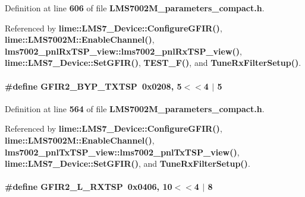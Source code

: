 Definition at line {\bf 606} of file {\bf L\+M\+S7002\+M\+\_\+parameters\+\_\+compact.\+h}.



Referenced by {\bf lime\+::\+L\+M\+S7\+\_\+\+Device\+::\+Configure\+G\+F\+I\+R()}, {\bf lime\+::\+L\+M\+S7002\+M\+::\+Enable\+Channel()}, {\bf lms7002\+\_\+pnl\+Rx\+T\+S\+P\+\_\+view\+::lms7002\+\_\+pnl\+Rx\+T\+S\+P\+\_\+view()}, {\bf lime\+::\+L\+M\+S7\+\_\+\+Device\+::\+Set\+G\+F\+I\+R()}, {\bf T\+E\+S\+T\+\_\+\+F()}, and {\bf Tune\+Rx\+Filter\+Setup()}.

\paragraph[{G\+F\+I\+R2\+\_\+\+B\+Y\+P\+\_\+\+T\+X\+T\+SP}]{\setlength{\rightskip}{0pt plus 5cm}\#define G\+F\+I\+R2\+\_\+\+B\+Y\+P\+\_\+\+T\+X\+T\+SP~0x0208, 5$<$$<$4 $\vert$  5}\label{LMS7002M__parameters__compact_8h_af43e1514b171da01c2199db95be0227a}


Definition at line {\bf 564} of file {\bf L\+M\+S7002\+M\+\_\+parameters\+\_\+compact.\+h}.



Referenced by {\bf lime\+::\+L\+M\+S7\+\_\+\+Device\+::\+Configure\+G\+F\+I\+R()}, {\bf lime\+::\+L\+M\+S7002\+M\+::\+Enable\+Channel()}, {\bf lms7002\+\_\+pnl\+Tx\+T\+S\+P\+\_\+view\+::lms7002\+\_\+pnl\+Tx\+T\+S\+P\+\_\+view()}, {\bf lime\+::\+L\+M\+S7\+\_\+\+Device\+::\+Set\+G\+F\+I\+R()}, and {\bf Tune\+Rx\+Filter\+Setup()}.

\paragraph[{G\+F\+I\+R2\+\_\+\+L\+\_\+\+R\+X\+T\+SP}]{\setlength{\rightskip}{0pt plus 5cm}\#define G\+F\+I\+R2\+\_\+\+L\+\_\+\+R\+X\+T\+SP~0x0406, 10$<$$<$4 $\vert$  8}\label{LMS7002M__parameters__compact_8h_af7a1214f684971206f87069fd89d0fd0}


